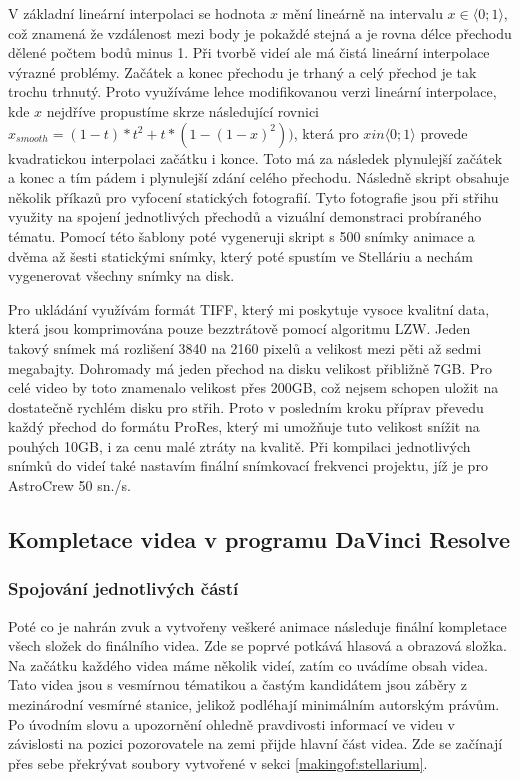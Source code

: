\documentclass[12pt,a4paper,titlepage]{article}
\begin{document}
V základní lineární interpolaci se hodnota $x$ mění lineárně na intervalu $x \in \langle0;1\rangle$, což znamená že vzdálenost mezi body je pokaždé stejná a je rovna délce přechodu dělené počtem bodů minus 1. Při tvorbě videí ale má čistá lineární interpolace výrazné problémy. Začátek a konec přechodu je trhaný a celý přechod je tak trochu trhnutý. Proto využíváme lehce modifikovanou verzi lineární interpolace, kde $x$ nejdříve propustíme skrze následující rovnici $x_{smooth} = (1 - t) * t^2 + t * (1-(1-x)^2))$, která pro $x in \langle0;1\rangle$ provede kvadratickou interpolaci začátku i konce. Toto má za následek plynulejší začátek a konec a tím pádem i plynulejší zdání celého přechodu. Následně skript obsahuje několik příkazů pro vyfocení statických fotografií. Tyto fotografie jsou při střihu využity na spojení jednotlivých přechodů a vizuální demonstraci probíraného tématu. Pomocí této šablony poté vygeneruji skript s 500 snímky animace a dvěma až šesti statickými snímky, který poté spustím ve Stelláriu a nechám vygenerovat všechny snímky na disk.

Pro ukládání využívám formát TIFF, který mi poskytuje vysoce kvalitní data, která jsou komprimována pouze bezztrátově pomocí algoritmu LZW. Jeden takový snímek má rozlišení 3840 na 2160 pixelů a velikost mezi pěti až sedmi megabajty. Dohromady má jeden přechod na disku velikost přibližně 7GB. Pro celé video by toto znamenalo velikost přes 200GB, což nejsem schopen uložit na dostatečně rychlém disku pro střih. Proto v posledním kroku příprav převedu každý přechod do formátu ProRes, který mi umožňuje tuto velikost snížit na pouhých 10GB, i za cenu malé ztráty na kvalitě. Při kompilaci jednotlivých snímků do videí také nastavím finální snímkovací frekvenci projektu, jíž je pro AstroCrew 50 sn./s.
\subsection{Kompletace videa v programu DaVinci Resolve} \label{makingof:resolve}
\subsubsection{Spojování jednotlivých částí} \label{makingof:resolve:merging}
Poté co je nahrán zvuk a vytvořeny veškeré animace následuje finální kompletace všech složek do finálního videa. Zde se poprvé potkává hlasová a obrazová složka. Na začátku každého videa máme několik videí, zatím co uvádíme obsah videa. Tato videa jsou s vesmírnou tématikou a častým kandidátem jsou záběry z mezinárodní vesmírné stanice, jelikož podléhají minimálním autorským právům. Po úvodním slovu a upozornění ohledně pravdivosti informací ve videu v závislosti na pozici pozorovatele na zemi přijde hlavní část videa. Zde se začínají přes sebe překrývat soubory vytvořené v sekci \ref{makingof:stellarium}. 
\end{document}
